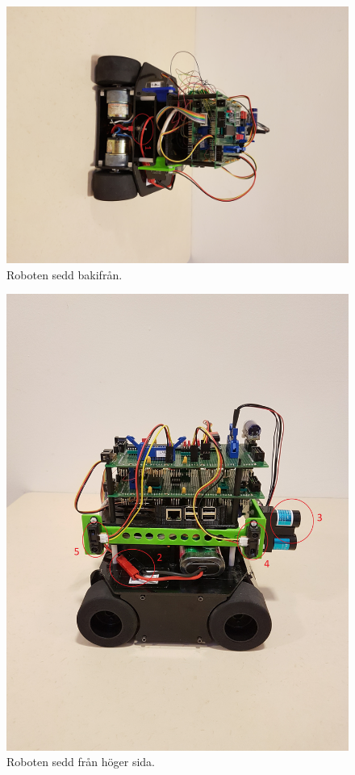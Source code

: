 \documentclass{article}
\begin{document}
\begin{figure}[H]
\centering
\includegraphics[scale=0.1]{robot_back}
\caption{Roboten sedd bakifrån.}
\label{fig:robot_back}
\end{figure}

\clearpage
\begin{figure}[H]
\centering
\includegraphics[scale=0.1]{robot_right_side}
\caption{Roboten sedd från höger sida.}
\label{fig:robot_right_side}
\end{figure}
\end{document}
